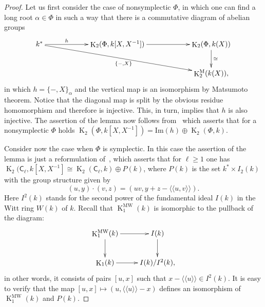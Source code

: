 \documentclass[oneside, 8pt]{amsart}
\theoremstyle{remark}
\theoremstyle{definition}
\numberwithin{lemma}{section}
\numberwithin{prop}{section}
\numberwithin{corollary}{section}
\numberwithin{externaltheorem}{section}
\DeclareMathOperator{\K}{K}
\newcommand{\inv}{^{-1}}
\newcommand{\rC}{\mathsf{C}}
\numberwithin{equation}{section}
\begin{document}
\begin{proof} Let us first consider the case of nonsymplectic $\Phi$, in which one can find a long root $\alpha\in \Phi$ in such a way that there is a commutative diagram of abelian groups
\[\xymatrixcolsep{5pc}\xymatrix{k^* \ar[r]^-{h} \ar[rrd]_{\{-, X\}} & \K_2(\Phi, k[X, X^{-1}]) \ar[r] & \K_2(\Phi, k(X)) \ar[d]^{\cong} \\
                                                                                      &                                 & \K_2^\mathrm{M}(k(X)),} \]
in which $h = \{ -, X \}_{\alpha}$ and the vertical map is an isomorphism by Matsumoto theorem.
Notice that the diagonal map is split by the obvious residue homomorphism and therefore is injective. This, in turn, implies that $h$ is also injective.
The assertion of the lemma now follows from~\cite[Satz~3]{Hur77} which asserts that for a nonsymplectic $\Phi$ holds $\K_2(\Phi, k[X, X\inv]) = \mathrm{Im}(h) \oplus \K_2(\Phi, k)$.

Consider now the case when $\Phi$ is symplectic. In this case the assertion of the lemma is just a reformulation of~\cite[Theorem~B]{MR91},
which asserts that for $\ell \geq 1$ one has $\K_2(\rC_\ell, k[X, X\inv] \cong \K_2(\rC_\ell, k) \oplus P(k)$, where
$P(k)$ is the set $k^* \times I_2(k)$ with the group structure given by
\[ (u, y) \cdot (v, z) = (uv, y + z - \langle\langle u, v\rangle\rangle).\]
Here $I^2(k)$ stands for the second power of the fundamental ideal $I(k)$ in the Witt ring $W(k)$ of $k$.
Recall that $\K_1^\mathrm{MW}(k)$ is isomorphic to the pullback of the diagram:
\[ \xymatrix{ \K_1^\mathrm{MW}(k) \ar[r] \ar[d] & I(k) \ar[d] \\ \K_1(k) \ar[r] & I(k)/I^2(k), } \]
in other words, it consists of pairs $[u, x]$ such that $x - \langle \langle u \rangle \rangle \in I^2(k)$.
It is easy to verify that the map $[u, x] \mapsto (u, \langle\langle u \rangle\rangle - x)$ defines an isomorphism of $\K_1^\mathrm{MW}(k)$ and $P(k)$. \end{proof}
 
\end{document}
